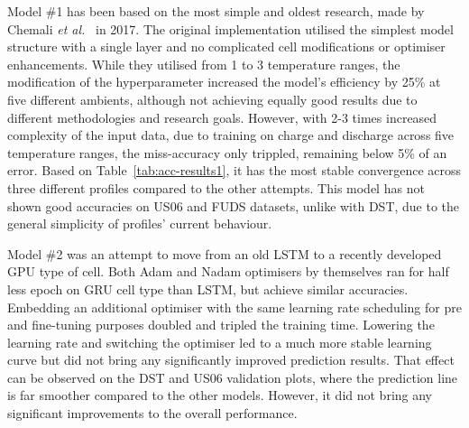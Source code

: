 %
%
Model \#1 has been based on the most simple and oldest research, made by Chemali \textit{et al.}~\cite{Chemali2017} in 2017.
The original implementation utilised the simplest model structure with a single layer and no complicated cell modifications or optimiser enhancements.
While they utilised from 1 to 3 temperature ranges, the modification of the hyperparameter increased the model's efficiency by 25\% at five different ambients, although not achieving equally good results due to different methodologies and research goals.
However, with 2-3 times increased complexity of the input data, due to training on charge and discharge across five temperature ranges, the miss-accuracy only trippled, remaining below 5\% of an error.
Based on Table~\ref{tab:acc-results1}, it has the most stable convergence across three different profiles compared to the other attempts.
This model has not shown good accuracies on US06 and FUDS datasets, unlike with DST, due to the general simplicity of profiles' current behaviour.


%
%
Model \#2 was an attempt to move from an old LSTM to a recently developed GPU type of cell.
Both Adam and Nadam optimisers by themselves ran for half less epoch on GRU cell type than LSTM, but achieve similar accuracies.
Embedding an additional optimiser with the same learning rate scheduling for pre and fine-tuning purposes doubled and tripled the training time.
Lowering the learning rate and switching the optimiser led to a much more stable learning curve but did not bring any significantly improved prediction results.
That effect can be observed on the DST and US06 validation plots, where the prediction line is far smoother compared to the other models.
However, it did not bring any significant improvements to the overall performance.

